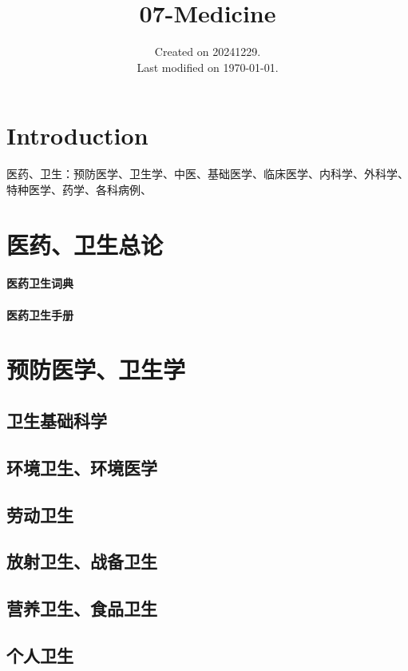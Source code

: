 \documentclass[UTF8]{../ApplicationUniverse}
\begin{document}
\title{07-Medicine}
\date{Created on 20241229.\\   Last modified on \today.}
\maketitle
\tableofcontents


\chapter{Introduction}


医药、卫生：预防医学、卫生学、中医、基础医学、临床医学、内科学、外科学、特种医学、药学、各科病例、



\chapter{医药、卫生总论}
\subsubsection{医药卫生词典}
\subsubsection{医药卫生手册}

\chapter{预防医学、卫生学}
\section{卫生基础科学}
\section{环境卫生、环境医学}
\section{劳动卫生}
\section{放射卫生、战备卫生}
\section{营养卫生、食品卫生}
\section{个人卫生}
\end{document}
